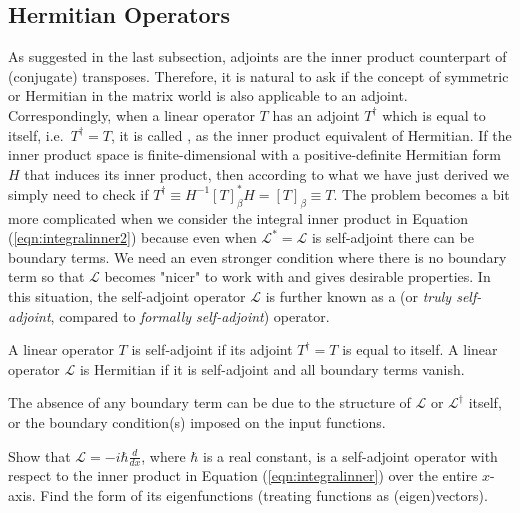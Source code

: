 \subsection{Hermitian Operators}
As suggested in the last subsection, adjoints are the inner product counterpart of (conjugate) transposes. Therefore, it is natural to ask if the concept of symmetric or Hermitian in the matrix world is also applicable to an adjoint. Correspondingly, when a linear operator $T$ has an adjoint $T^\dag$ which is equal to itself, i.e.\ $T^\dag = T$, it is called , as the inner product equivalent of Hermitian. If the inner product space is finite-dimensional with a positive-definite Hermitian form $H$ that induces its inner product, then according to what we have just derived we simply need to check if $T^\dag \equiv H^{-1} [T]_\beta^* H = [T]_\beta \equiv T$. The problem becomes a bit more complicated when we consider the integral inner product in Equation (\ref{eqn:integralinner2}) because even when $\mathcal{L}^* = \mathcal{L}$ is self-adjoint there can be boundary terms. We need an even stronger condition where there is no boundary term so that $\mathcal{L}$ becomes "nicer" to work with and gives desirable properties. In this situation, the self-adjoint operator $\mathcal{L}$ is further known as a  (or \textit{truly self-adjoint}, compared to \textit{formally self-adjoint}) operator.
\begin{defn}
\label{defn:selfadjoint}
A linear operator $T$ is self-adjoint if its adjoint $T^\dag = T$ is equal to itself. A linear operator $\mathcal{L}$ is Hermitian if it is self-adjoint and all boundary terms vanish.
\end{defn}
The absence of any boundary term can be due to the structure of $\mathcal{L}$ or $\mathcal{L}^\dag$ itself, or the boundary condition(s) imposed on the input functions. 
\begin{exmp}
Show that $\mathcal{L} = -i\hbar\frac{d}{dx}$, where $\hbar$ is a real constant, is a self-adjoint operator with respect to the inner product in Equation (\ref{eqn:integralinner}) over the entire $x$-axis. Find the form of its eigenfunctions (treating functions as (eigen)vectors).
\end{exmp}
